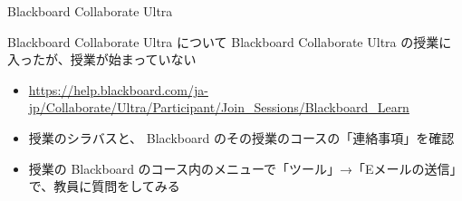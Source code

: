 \documentclass[a4j,10pt]{jsarticle}
\def\lthtmlcheckvsize{\ifdim\ht\sizebox<\vsize 
  \ifdim\wd\sizebox<\hsize\expandafter\hfill\fi \expandafter\vfill
  \else\expandafter\vss\fi}%
\begin{document}
{\newpage\clearpage
{}%
\begin{frame}[label={sec:orga9ef297},fragile]{Blackboard Collaborate Ultra}
\begin{block}{Blackboard Collaborate Ultra について}
Blackboard Collaborate Ultra の授業に入ったが、授業が始まっていない
\par
\begin{itemize}
\item \url{https://help.blackboard.com/ja-jp/Collaborate/Ultra/Participant/Join\_Sessions/Blackboard\_Learn}
\item 授業のシラバスと、 Blackboard のその授業のコースの「連絡事項」を確認
\item 授業の Blackboard のコース内のメニューで「ツール」→「Eメールの送信」で、教員に質問をしてみる
\end{itemize}
\end{block}
\end{frame}%
\lthtmlfigureZ
\lthtmlcheckvsize\clearpage}
\end{document}
